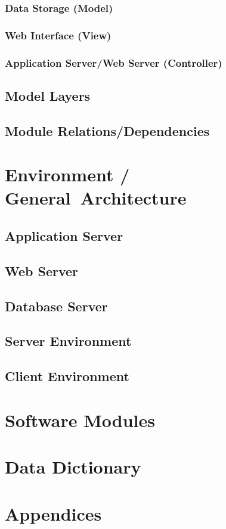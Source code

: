 \documentclass[11pt,a4paper,oneside,svgnames]{report}
\begin{document}
\subsection{Data Storage (Model)}
\subsection{Web Interface (View)}
\subsection{Application Server/Web Server (Controller)}
\section{Model Layers}
\section{Module Relations/Dependencies}
\chapter{Environment / General~Architecture}
\section{Application Server}
\section{Web Server}
\section{Database Server}
\section{Server Environment}
\section{Client Environment}
\chapter{Software Modules}
\chapter{Data Dictionary}


\chapter{Appendices}
\printglossaries
\end{document}
